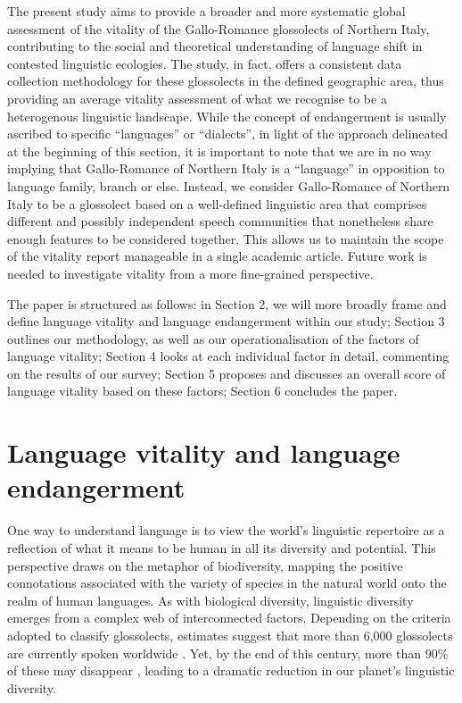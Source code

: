\documentclass[a4paper,11pt]{article}
\begin{document}
The present study aims to provide a broader and more systematic global assessment of the vitality of the Gallo-Romance glossolects of Northern Italy, contributing to the social and theoretical understanding of language shift in contested linguistic ecologies. The study, in fact, offers a consistent data collection methodology for these glossolects in the defined geographic area, thus providing an average vitality assessment of what we recognise to be a heterogenous linguistic landscape. While the concept of endangerment is usually ascribed to specific ``languages'' or ``dialects'', in light of the approach delineated at the beginning of this section, it is important to note that we are in no way implying that Gallo-Romance of Northern Italy is a ``language'' in opposition to language family, branch or else. Instead, we consider Gallo-Romance of Northern Italy to be a glossolect based on a well-defined linguistic area that comprises different and possibly independent speech communities that nonetheless share enough features to be considered together. This allows us to maintain the scope of the vitality report manageable in a single academic article. Future work is needed to investigate vitality from a more fine-grained perspective.

The paper is structured as follows: in Section 2, we will more broadly frame and define language vitality and language endangerment within our study; Section 3 outlines our methodology, as well as our operationalisation of the \citet{unesco2003, unesco2011} factors of language vitality; Section 4 looks at each individual factor in detail, commenting on the results of our survey; Section 5 proposes and discusses an overall score of language vitality based on these factors; Section 6 concludes the paper.
 


\section{Language vitality and language endangerment}

One way to understand language is to view the world’s linguistic repertoire as a reflection of what it means to be human in all its diversity and potential. This perspective draws on the metaphor of biodiversity, mapping the positive connotations associated with the variety of species in the natural world onto the realm of human languages. As with biological diversity, linguistic diversity emerges from a complex web of interconnected factors. Depending on the criteria adopted to classify glossolects, estimates suggest that more than 6,000 glossolects are currently spoken worldwide \citep{sallabank2013attitudes, tsunoda2006language}. Yet, by the end of this century, more than 90\% of these may disappear \citep{piirainen2015language, krauss2008}, leading to a dramatic reduction in our planet’s linguistic diversity.
\end{document}
